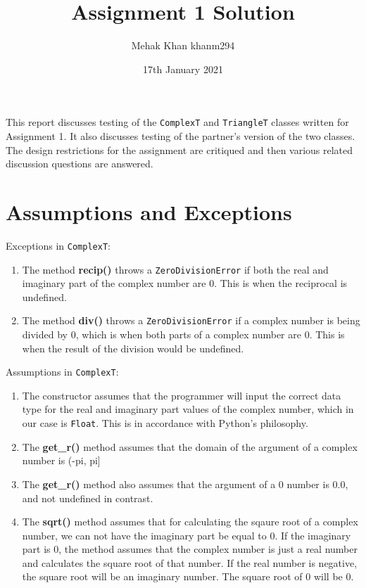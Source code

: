 \documentclass[12pt]{article}
\title{Assignment 1 Solution}
\author{Mehak Khan khanm294}
\date{17th January 2021}
\begin{document}
\maketitle

This report discusses testing of the \verb|ComplexT| and \verb|TriangleT|
classes written for Assignment 1. It also discusses testing of the partner's
version of the two classes. The design restrictions for the assignment
are critiqued and then various related discussion questions are answered.

\section{Assumptions and Exceptions} \label{AssumptAndExcept}

\noindent Exceptions in \verb|ComplexT|:
\begin{enumerate}
  \item The method \textbf{recip()} throws a \verb|ZeroDivisionError| if both the real and imaginary part of the complex number are 0. This is when the reciprocal is undefined.
  \item The method \textbf{div()} throws a \verb|ZeroDivisionError| if a complex number is being divided by 0, which is when both parts of a complex number are 0. This is when the result of the division would be undefined.
\end{enumerate}
Assumptions in \verb|ComplexT|:
\begin{enumerate}
  \item The constructor assumes that the programmer will input the correct data type for the real and imaginary part values of the complex number, which in our case is \verb|Float|. This is in accordance with Python's philosophy.
  \item The  \textbf{get\_r()} method assumes that the domain of the argument of a complex number is (-pi, pi]
  \item The \textbf{get\_r()} method also assumes that the argument of a 0 number is 0.0, and not undefined in contrast.
  \item The \textbf{sqrt()} method assumes that for calculating the sqaure root of a complex number, we can not have the imaginary part be equal to 0. If the imaginary part is 0, the method assumes that the complex number is just a real number and calculates the square root of that number. If the real number is negative, the square root will be an imaginary number. The square root of 0 will be 0. 
\end{enumerate}
\end{document}
